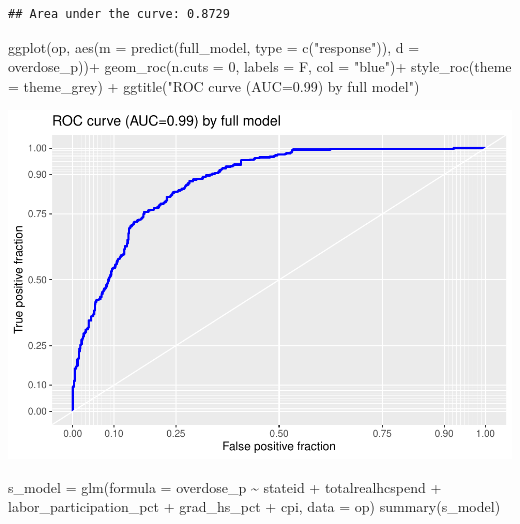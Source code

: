 \documentclass[
]{article}
\newenvironment{Shaded}{\begin{snugshade}}{\end{snugshade}}
\newcommand{\AttributeTok}[1]{\textcolor[rgb]{0.77,0.63,0.00}{#1}}
\newcommand{\DecValTok}[1]{\textcolor[rgb]{0.00,0.00,0.81}{#1}}
\newcommand{\FunctionTok}[1]{\textcolor[rgb]{0.00,0.00,0.00}{#1}}
\newcommand{\NormalTok}[1]{#1}
\newcommand{\OtherTok}[1]{\textcolor[rgb]{0.56,0.35,0.01}{#1}}
\newcommand{\SpecialCharTok}[1]{\textcolor[rgb]{0.00,0.00,0.00}{#1}}
\newcommand{\StringTok}[1]{\textcolor[rgb]{0.31,0.60,0.02}{#1}}
\begin{document}
\begin{verbatim}
## Area under the curve: 0.8729
\end{verbatim}

\begin{Shaded}
\begin{Highlighting}[]
\FunctionTok{ggplot}\NormalTok{(op, }\FunctionTok{aes}\NormalTok{(}\AttributeTok{m =} \FunctionTok{predict}\NormalTok{(full\_model, }\AttributeTok{type =} \FunctionTok{c}\NormalTok{(}\StringTok{"response"}\NormalTok{)), }\AttributeTok{d =}\NormalTok{ overdose\_p))}\SpecialCharTok{+} \FunctionTok{geom\_roc}\NormalTok{(}\AttributeTok{n.cuts =} \DecValTok{0}\NormalTok{, }\AttributeTok{labels =}\NormalTok{ F, }\AttributeTok{col =} \StringTok{"blue"}\NormalTok{)}\SpecialCharTok{+} \FunctionTok{style\_roc}\NormalTok{(}\AttributeTok{theme =}\NormalTok{ theme\_grey) }\SpecialCharTok{+} \FunctionTok{ggtitle}\NormalTok{(}\StringTok{"ROC curve (AUC=0.99) by full model"}\NormalTok{)}
\end{Highlighting}
\end{Shaded}

\includegraphics{Final-project_Annie-Lin-1_files/figure-latex/unnamed-chunk-15-1.pdf}

\begin{Shaded}
\begin{Highlighting}[]
\NormalTok{s\_model }\OtherTok{=} \FunctionTok{glm}\NormalTok{(}\AttributeTok{formula =}\NormalTok{ overdose\_p }\SpecialCharTok{\textasciitilde{}}\NormalTok{ stateid }\SpecialCharTok{+}\NormalTok{ totalrealhcspend }\SpecialCharTok{+}\NormalTok{ labor\_participation\_pct }\SpecialCharTok{+}
\NormalTok{                grad\_hs\_pct }\SpecialCharTok{+}\NormalTok{ cpi, }\AttributeTok{data =}\NormalTok{ op)}
\FunctionTok{summary}\NormalTok{(s\_model)}
\end{Highlighting}
\end{Shaded}
\end{document}
